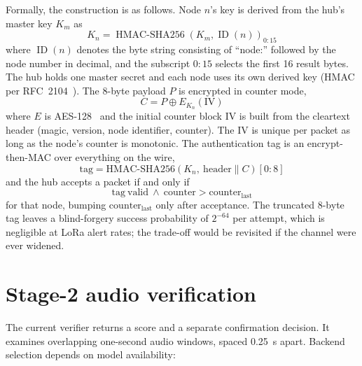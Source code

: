 \documentclass[12pt,a4paper]{report}
\begin{document}
Formally, the construction is as follows. Node $n$'s key is derived
from the hub's master key $K_m$ as
\begin{equation}
\label{eq:keyderive}
K_n = \operatorname{HMAC\mbox{-}SHA256}(K_m,\operatorname{ID}(n))_{0:15}
\end{equation}
where $\operatorname{ID}(n)$ denotes the byte string consisting of
``node:'' followed by the node number in decimal, and the subscript
$0{:}15$ selects the first 16 result bytes. The hub holds one master
secret and each node uses its own derived key (HMAC per
RFC~2104~\cite{rfc2104}). The 8-byte payload $P$ is
encrypted in counter mode,
\begin{equation}
\label{eq:ctr}
C = P \oplus E_{K_n}(\mathrm{IV})
\end{equation}
where $E$ is AES-128~\cite{fips197} and the initial counter block IV
is built from the cleartext header (magic, version, node identifier,
counter). The IV is unique per packet as long as the node's counter
is monotonic. The authentication tag is an encrypt-then-MAC over
everything on the wire,
\begin{equation}
\label{eq:mac}
\mathrm{tag} = \mathrm{HMAC\mbox{-}SHA256}\!\left(K_n,\
\mathrm{header} \parallel C\right)[0{:}8]
\end{equation}
and the hub accepts a packet if and only if
\begin{equation}
\label{eq:accept}
\mathrm{tag\ valid}\ \wedge\ \mathrm{counter} >
\mathrm{counter}_{\mathrm{last}}
\end{equation}
for that node, bumping $\mathrm{counter}_{\mathrm{last}}$ only after
acceptance. The truncated 8-byte tag leaves a blind-forgery success
probability of $2^{-64}$ per attempt, which is negligible at LoRa
alert rates; the trade-off would be revisited if the channel were
ever widened.

\section{Stage-2 audio verification}
\label{sec:stage2}

The current verifier returns a score and a separate confirmation
decision. It examines overlapping one-second audio windows, spaced
0.25~s apart. Backend selection depends on model availability:
\end{document}
